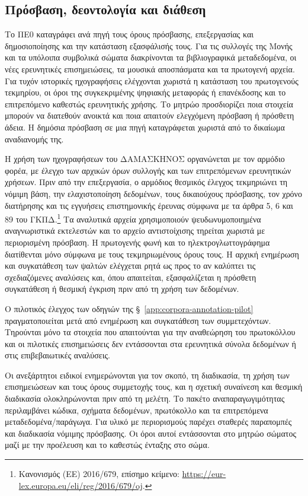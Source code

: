 \documentclass[11pt,a4paper]{article}
\begin{document}
\subsection{Πρόσβαση, δεοντολογία και διάθεση}\label{app:corpora-rights}

Το ΠΕ0 καταγράφει ανά πηγή τους όρους πρόσβασης, επεξεργασίας και δημοσιοποίησης και την κατάσταση εξασφάλισής τους. Για τις συλλογές της Μονής και τα υπόλοιπα συμβολικά σώματα διακρίνονται τα βιβλιογραφικά μεταδεδομένα, οι νέες ερευνητικές επισημειώσεις, τα μουσικά αποσπάσματα και τα πρωτογενή αρχεία. Για τυχόν ιστορικές ηχογραφήσεις ελέγχονται χωριστά η κατάσταση του πρωτογενούς τεκμηρίου, οι όροι της συγκεκριμένης ψηφιακής μεταφοράς ή επανέκδοσης και το επιτρεπόμενο καθεστώς ερευνητικής χρήσης. Το μητρώο προσδιορίζει ποια στοιχεία μπορούν να διατεθούν ανοικτά και ποια απαιτούν ελεγχόμενη πρόσβαση ή πρόσθετη άδεια. Η δημόσια πρόσβαση σε μια πηγή καταγράφεται χωριστά από το δικαίωμα αναδιανομής της.

Η χρήση των ηχογραφήσεων του ΔΑΜΑΣΚΗΝΟΣ οργανώνεται με τον αρμόδιο φορέα, με έλεγχο των αρχικών όρων συλλογής και των επιτρεπόμενων ερευνητικών χρήσεων. Πριν από την επεξεργασία, ο αρμόδιος θεσμικός έλεγχος τεκμηριώνει τη νόμιμη βάση, την ελαχιστοποίηση δεδομένων, τους δικαιούχους πρόσβασης, τον χρόνο διατήρησης και τις εγγυήσεις επιστημονικής έρευνας σύμφωνα με τα άρθρα 5, 6 και 89 του ΓΚΠΔ.\footnote{Κανονισμός (ΕΕ) 2016/679, επίσημο κείμενο: \url{https://eur-lex.europa.eu/eli/reg/2016/679/oj}.} Τα αναλυτικά αρχεία χρησιμοποιούν ψευδωνυμοποιημένα αναγνωριστικά εκτελεστών και το αρχείο αντιστοίχισης τηρείται χωριστά με περιορισμένη πρόσβαση. Η πρωτογενής φωνή και το ηλεκτρογλωττογράφημα διατίθενται μόνο σύμφωνα με τους τεκμηριωμένους όρους τους. Η αρχική ενημέρωση και συγκατάθεση των ψαλτών ελέγχεται ρητά ως προς το αν καλύπτει τις σχεδιαζόμενες αναλύσεις και, όπου απαιτείται, εξασφαλίζεται η πρόσθετη συγκατάθεση ή θεσμική έγκριση πριν από τη χρήση των δεδομένων.

Ο πιλοτικός έλεγχος των οδηγιών της §~\ref{app:corpora-annotation-pilot} πραγματοποιείται μετά από ενημέρωση και συγκατάθεση των συμμετεχόντων. Τηρούνται μόνο τα στοιχεία που απαιτούνται για την αναθεώρηση του πρωτοκόλλου και οι πιλοτικές επισημειώσεις δεν εντάσσονται στα ερευνητικά σύνολα δεδομένων ή στις επιβεβαιωτικές αναλύσεις.

Οι ανεξάρτητοι ειδικοί ενημερώνονται για τον σκοπό, τη διαδικασία, τη χρήση των επισημειώσεων και τους όρους συμμετοχής τους, και η σχετική συναίνεση και θεσμική διαδικασία ολοκληρώνονται πριν από τη μελέτη. Το πακέτο αναπαραγωγιμότητας περιλαμβάνει κώδικα, σχήματα δεδομένων, πρωτόκολλο και τα επιτρεπόμενα μεταδεδομένα/παράγωγα. Για υλικό με περιορισμούς παρέχει σταθερές παραπομπές και διαδικασία νόμιμης πρόσβασης. Οι όροι αυτοί εντάσσονται στο μητρώο σώματος μαζί με την προέλευση και το καθεστώς ένταξης στο σώμα.
\end{document}
